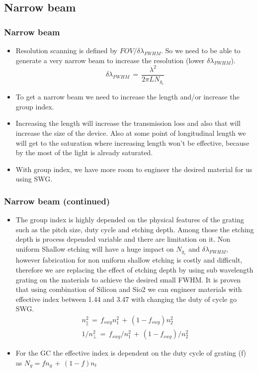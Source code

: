 \documentclass{beamer}
\begin{document}
\subsection{Narrow beam} 
\begin{frame}
\frametitle{Narrow beam}
\begin{itemize}
\item Resolution scanning is defined by $FOV/\delta \lambda_{FWHM}$. So we need to be able to generate a very narrow beam to increase the resolution (lower $\delta \lambda_{FWHM}$).
    \begin{equation}
    \delta \lambda_{FWHM} \, = \, \frac{\lambda^2}{2 \pi L N_{g_c}}
    \end{equation}
\item To get a narrow beam we need to increase the length and/or increase the group index.
\item Increasing the length will increase the transmission loss and also that will increase the size of the device. Also at some point of longitudinal length we will get to the saturation where increasing length won't be effective, because by the most of the light is already saturated.
\item With group index, we have more room to engineer the desired material for us using SWG. 
\end{itemize}
\end{frame}
%
\begin{frame}
\frametitle{Narrow beam (continued)}
\begin{itemize}
\item  The group index is highly depended on the physical features of the grating such as the pitch size, duty cycle and etching depth. Among those the etching depth is process depended variable and there are limitation on it. Non uniform Shallow etching will have a huge impact on $N_{g_c}$ and $\delta \lambda_{FWHM} $,  however fabrication for non uniform shallow etching is costly and difficult, therefore we are replacing the effect of etching depth by using sub wavelength grating on the materials to achieve the desired small FWHM. It is proven that using combination of Silicon and Sio2 we can engineer materials with effective index between 1.44 and 3.47 with changing the duty of cycle go SWG. 
\begin{eqnarray*}
n^2_	\parallel \,= \, f_{swg} n^2_1 \, + \, (1-f_{swg})n^2_2 \\
1/n^2_\perp \,= \, f_{swg} /n^2_1 \, + \, (1-f_{swg})/n^2_2 
\end{eqnarray*}
\item For the GC the effective index is dependent on the duty cycle of grating (f) as $N_{g} = f n_g \, + \, (1-f)n_t$
\end{itemize}
\end{frame}
%
\end{document}
